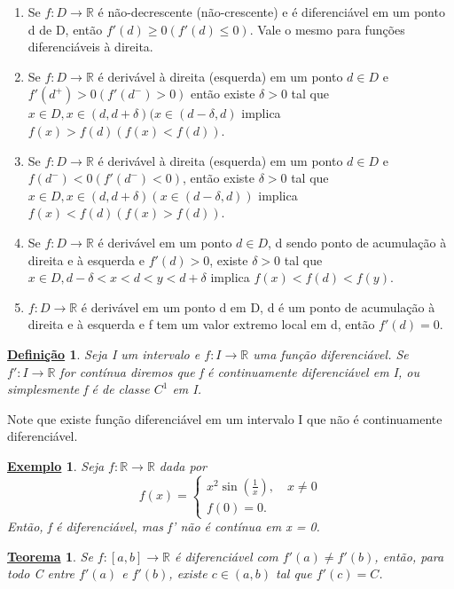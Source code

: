 \documentclass{article}
\newtheorem*{def*}{\underline{Defini\c c\~ao}}
\newtheorem*{theorem*}{\underline{Teorema}}
\newtheorem{example}{\underline{Exemplo}}
\begin{document}
 \begin{enumerate}
 \item Se \(f:D\rightarrow \mathbb{R}\) é não-decrescente (não-crescente) e é
diferenciável em um ponto d de D, então \(f'(d)\geq 0 (f'(d)\leq 0)\). Vale o mesmo
para fun\c cões diferenciáveis à direita.
 \item Se \(f:D\rightarrow \mathbb{R}\) é derivável à direita (esquerda) em um ponto
\(d\in D\) e \(f'(d^{+}) > 0 (f'(d^{-}) > 0)\) então existe \(\delta >0\) tal que
\(x\in D, x\in (d, d+\delta )(x\in (d-\delta , d)\) implica \(f(x) > f(d) (f(x) < f(d)).\)
 \item Se \(f:D\rightarrow \mathbb{R}\) é derivável à direita (esquerda) em um 
ponto \(d\in D\) e \(f(d^{-}) < 0 (f'(d^{-}) < 0)\), então existe \(\delta >0\) tal que
\(x\in D, x\in(d, d+\delta )(x\in (d-\delta, d))\) implica \(f(x) < f(d) (f(x) > f(d)).\)
  \item Se \(f:D\rightarrow \mathbb{R}\) é derivável em um ponto \(d\in D\),
d sendo ponto de acumula\c cão à direita e à esquerda e \(f'(d) > 0\), existe \(\delta  > 0\)
tal que \(x\in D, d-\delta < x < d < y < d+\delta\) implica \(f(x) < f(d) < f(y).\)
\item \(f:D\rightarrow \mathbb{R}\) é derivável em um ponto d em D, d é um ponto
de acumula\c cão à direita e à esquerda e f tem um valor extremo local em d, então \(f'(d) = 0.\)
 \end{enumerate}
\begin{def*}
  Seja I um intervalo e \(f:I\rightarrow \mathbb{R}\) uma fun\c cão diferenciável.
Se \(f':I\rightarrow \mathbb{R}\) for contínua diremos que f é continuamente diferenciável
em I, ou simplesmente f é de classe \(C^{1}\) em I.
\end{def*}
  Note que existe fun\c cão diferenciável em um intervalo I que não é 
continuamente diferenciável.
 \begin{example}
   Seja \(f:\mathbb{R}\rightarrow \mathbb{R}\) dada por 
     \[
       f(x) = \left\{\begin{array}{ll}
           x^{2}\sin{(\frac{1}{x})},\quad x\neq0\\
           f(0) = 0.
         \end{array}\right.
     \]
     Então, f é diferenciável, mas f' não é contínua em x = 0.
 \end{example}
 \hypertarget{darboux}{
\begin{theorem*}
  Se \(f:[a, b]\rightarrow \mathbb{R}\) é diferenciável com \(f'(a)\neq f'(b)\), então,
  para todo C entre \(f'(a)\) e \(f'(b)\), existe \(c\in (a, b)\) tal que 
  \(f'(c) = C\).
\end{theorem*}}
\end{document}

